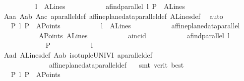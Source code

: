 \begin{isabellebody}
\ \ \ \ \ \ \ \ \ \ l\ {\isasymin}\ A{}Lines\ {\isasymlongrightarrow}\isanewline
\ \ \ \ \ \ \ \ \ \ a{}find{\isacharunderscore}{\kern0pt}parallel\ l\ P\ {\isasymin}\ A{}Lines{\isachardoublequoteclose}\ \isanewline
\ \ \ \ \isamarkupfalse%
\ A{}{\isacharunderscore}{\kern0pt}a{}a\ A{}{\isacharunderscore}{\kern0pt}a{}b\ A{}{\isacharunderscore}{\kern0pt}a{}c\ a{}parallel{\isacharunderscore}{\kern0pt}def\ affine{\isacharunderscore}{\kern0pt}plane{\isacharunderscore}{\kern0pt}data{\isachardot}{\kern0pt}parallel{\isacharunderscore}{\kern0pt}def\ A{}Lines{\isacharunderscore}{\kern0pt}def\ \isamarkupfalse%
\ auto\isanewline
{}\isamarkupfalse%
\isanewline
\ \ \isamarkupfalse%
\ {}{\isacharcolon}{\kern0pt}\ {\isachardoublequoteopen}\ {\isasymforall}P\ l{\isachardot}{\kern0pt}\ P\ {\isasymin}\ A{}Points\ {\isasymlongrightarrow}\isanewline
\ \ \ \ \ \ \ \ \ \ l\ {\isasymin}\ A{}Lines\ {\isasymlongrightarrow}\isanewline
\ \ \ \ \ \ \ \ \ \ affine{\isacharunderscore}{\kern0pt}plane{\isacharunderscore}{\kern0pt}data{\isachardot}{\kern0pt}parallel\isanewline
\ \ \ \ \ \ \ \ \ \ \ A{}Points\ A{}Lines\isanewline
\ \ \ \ \ \ \ \ \ \ \ a{}incid\isanewline
\ \ \ \ \ \ \ \ \ \ \ {\isacharparenleft}{\kern0pt}a{}find{\isacharunderscore}{\kern0pt}parallel\ l\isanewline
\ \ \ \ \ \ \ \ \ \ \ \ \ P{\isacharparenright}{\kern0pt}\isanewline
\ \ \ \ \ \ \ \ \ \ \ l{\isachardoublequoteclose}\ \isamarkupfalse%
\ A{}{\isacharunderscore}{\kern0pt}a{}d\ A{}Lines{\isacharunderscore}{\kern0pt}def\ A{}{\isacharunderscore}{\kern0pt}a{}b\ iso{\isacharunderscore}{\kern0pt}tuple{\isacharunderscore}{\kern0pt}UNIV{\isacharunderscore}{\kern0pt}I\ a{}parallel{\isacharunderscore}{\kern0pt}def\ \isanewline
\ \ \ \ \ \ \ \ \ \ \ \ \ \ affine{\isacharunderscore}{\kern0pt}plane{\isacharunderscore}{\kern0pt}data{\isachardot}{\kern0pt}parallel{\isacharunderscore}{\kern0pt}def\ \ \isamarkupfalse%
\ {\isacharparenleft}{\kern0pt}smt\ {\isacharparenleft}{\kern0pt}verit{\isacharcomma}{\kern0pt}\ best{\isacharparenright}{\kern0pt}{\isacharparenright}{\kern0pt}\isanewline
{}\isamarkupfalse%
\isanewline
\ \ \isamarkupfalse%
\ {}{\isacharcolon}{\kern0pt}\ {\isachardoublequoteopen}\ {\isasymforall}P\ l{\isachardot}{\kern0pt}\ P\ {\isasymin}\ A{}Points\ {\isasymlongrightarrow}\isanewline

\end{isabellebody}
